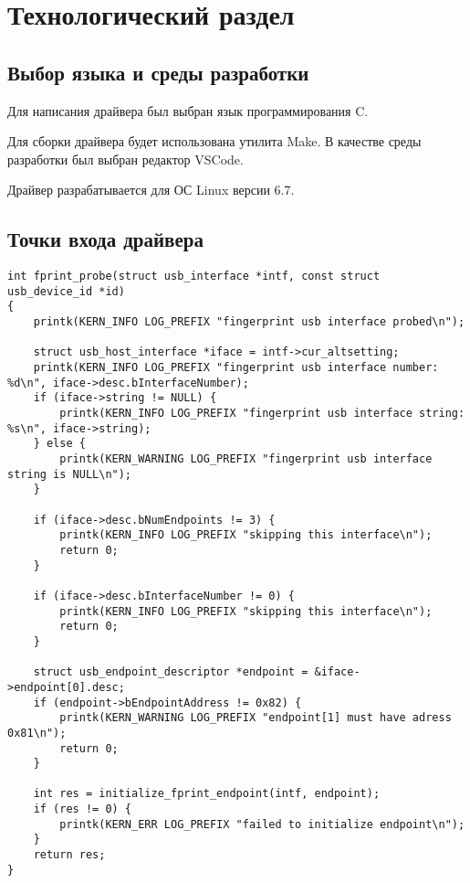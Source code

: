 \chapter{Технологический раздел}

\section{Выбор языка и среды разработки}

Для написания драйвера был выбран язык программирования C.

Для сборки драйвера будет использована утилита Make. В качестве среды разработки был выбран редактор VSCode.

Драйвер разрабатывается для ОС Linux версии 6.7.

\section{Точки входа драйвера}

\begin{lstlisting}[caption={функция \texttt{probe} драйвера}]
int fprint_probe(struct usb_interface *intf, const struct usb_device_id *id)
{
    printk(KERN_INFO LOG_PREFIX "fingerprint usb interface probed\n");

    struct usb_host_interface *iface = intf->cur_altsetting;
    printk(KERN_INFO LOG_PREFIX "fingerprint usb interface number: %d\n", iface->desc.bInterfaceNumber);
    if (iface->string != NULL) {
        printk(KERN_INFO LOG_PREFIX "fingerprint usb interface string: %s\n", iface->string);
    } else {
        printk(KERN_WARNING LOG_PREFIX "fingerprint usb interface string is NULL\n");
    }

    if (iface->desc.bNumEndpoints != 3) {
        printk(KERN_INFO LOG_PREFIX "skipping this interface\n");
        return 0;
    }

    if (iface->desc.bInterfaceNumber != 0) {
        printk(KERN_INFO LOG_PREFIX "skipping this interface\n");
        return 0;
    }

    struct usb_endpoint_descriptor *endpoint = &iface->endpoint[0].desc;
    if (endpoint->bEndpointAddress != 0x82) {
        printk(KERN_WARNING LOG_PREFIX "endpoint[1] must have adress 0x81\n");
        return 0;
    }

    int res = initialize_fprint_endpoint(intf, endpoint);
    if (res != 0) {
        printk(KERN_ERR LOG_PREFIX "failed to initialize endpoint\n");
    }
    return res;
}
\end{lstlisting}

